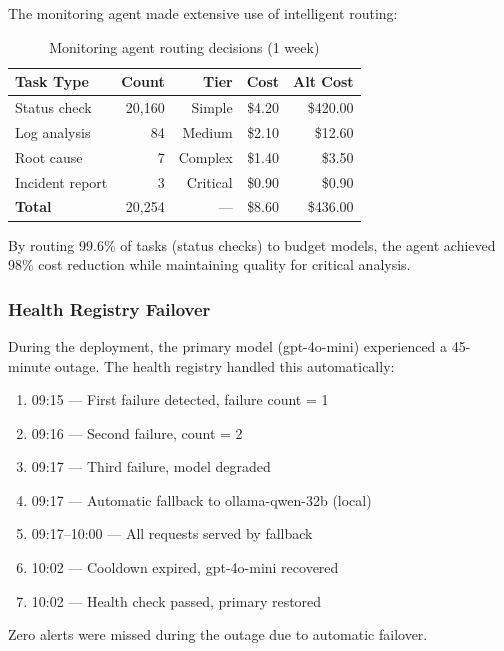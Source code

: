 \documentclass{article}
\begin{document}
The monitoring agent made extensive use of intelligent routing:

\begin{table}[h]
\centering
\caption{Monitoring agent routing decisions (1 week)}
\label{tab:monitor_routing}
\begin{tabular}{lrrrr}
\toprule
\textbf{Task Type} & \textbf{Count} & \textbf{Tier} & \textbf{Cost} & \textbf{Alt Cost} \\
\midrule
Status check & 20,160 & Simple & \$4.20 & \$420.00 \\
Log analysis & 84 & Medium & \$2.10 & \$12.60 \\
Root cause & 7 & Complex & \$1.40 & \$3.50 \\
Incident report & 3 & Critical & \$0.90 & \$0.90 \\
\midrule
\textbf{Total} & 20,254 & --- & \$8.60 & \$436.00 \\
\bottomrule
\end{tabular}
\end{table}

By routing 99.6\% of tasks (status checks) to budget models, the agent achieved 98\% cost reduction while maintaining quality for critical analysis.

\subsubsection{Health Registry Failover}

During the deployment, the primary model (gpt-4o-mini) experienced a 45-minute outage. The health registry handled this automatically:

\begin{enumerate}[leftmargin=*]
    \item 09:15 --- First failure detected, failure count = 1
    \item 09:16 --- Second failure, count = 2
    \item 09:17 --- Third failure, model degraded
    \item 09:17 --- Automatic fallback to ollama-qwen-32b (local)
    \item 09:17--10:00 --- All requests served by fallback
    \item 10:02 --- Cooldown expired, gpt-4o-mini recovered
    \item 10:02 --- Health check passed, primary restored
\end{enumerate}

Zero alerts were missed during the outage due to automatic failover.
\end{document}
